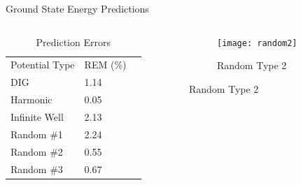 \documentclass{beamer}
\begin{document}
\begin{frame}{Ground State Energy Predictions}
\begin{columns}
    \begin{column}{0.4\textwidth}
        \begin{table}[]
            \centering
            \caption{Prediction Errors}
            \begin{tabular}{lll}
            Potential Type & REM (\%) \\
            DIG            & 1.14     \\
            Harmonic       & 0.05     \\
            Infinite Well  & 2.13     \\
            Random \#1     & 2.24     \\
            Random \#2     & 0.55     \\
            Random \#3     & 0.67                    
            \end{tabular} 
        \end{table}
    \end{column}
    \begin{column}{0.8\textwidth}
    \graphicspath{{"../figs/training/"}}
    \begin{figure}[H]
        \begin{subfigure}[t]{0.80\textwidth}
            \texttt{[image: random2]}
        \caption{Random Type 2}
        \end{subfigure}
    \end{figure}
    \end{column}
\end{columns}
\end{frame}
\end{document}
